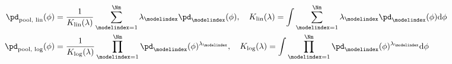 \begin{align}
  \pd_{\text{pool, lin}}(\phi) &=
    \frac{1}{K_{\text{lin}}(\lambda)}
    \sum_{\modelindex = 1}^{\Nm} \lambda_{\modelindex} \pd_{\modelindex}(\phi), \quad
  K_{\text{lin}}(\lambda) = \int \sum_{\modelindex = 1}^{\Nm} \lambda_{\modelindex} \pd_{\modelindex}(\phi) \text{d}\phi \label{eqn:orig-pooling-linear}\\
  \pd_{\text{pool, log}}(\phi) &=  
    \frac{1}{K_{\text{log}}(\lambda)}
    \prod_{\modelindex = 1}^{\Nm} \pd_{\modelindex}(\phi)^{\lambda_{\modelindex}}, \quad
  K_{\text{log}}(\lambda) = \int \prod_{\modelindex = 1}^{\Nm} \pd_{\modelindex}(\phi)^{\lambda_{\modelindex}} \text{d}\phi
  \label{eqn:orig-pooling-logarithmic}
\end{align}